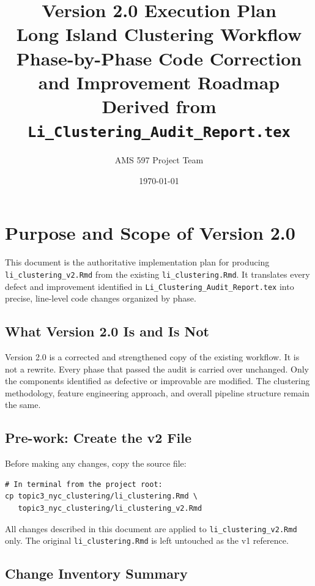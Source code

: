 \documentclass[11pt]{article}
\title{Version 2.0 Execution Plan\\Long Island Clustering Workflow\\
\large Phase-by-Phase Code Correction and Improvement Roadmap\\
Derived from \texttt{Li\_Clustering\_Audit\_Report.tex}}
\author{AMS 597 Project Team}
\date{\today}
\newcommand{\rfile}[1]{\texttt{#1}}
\begin{document}
\maketitle
\tableofcontents
\newpage

\section{Purpose and Scope of Version 2.0}

This document is the authoritative implementation plan for producing
\rfile{li\_clustering\_v2.Rmd} from the existing \rfile{li\_clustering.Rmd}.
It translates every defect and improvement identified in
\rfile{Li\_Clustering\_Audit\_Report.tex} into precise, line-level code changes
organized by phase.

\subsection{What Version 2.0 Is and Is Not}

Version 2.0 is a corrected and strengthened copy of the existing workflow.
It is not a rewrite. Every phase that passed the audit is carried over
unchanged. Only the components identified as defective or improvable are
modified. The clustering methodology, feature engineering approach, and overall
pipeline structure remain the same.

\subsection{Pre-work: Create the v2 File}

Before making any changes, copy the source file:

\begin{lstlisting}
# In terminal from the project root:
cp topic3_nyc_clustering/li_clustering.Rmd \
   topic3_nyc_clustering/li_clustering_v2.Rmd
\end{lstlisting}

All changes described in this document are applied to
\rfile{li\_clustering\_v2.Rmd} only. The original
\rfile{li\_clustering.Rmd} is left untouched as the v1 reference.

\subsection{Change Inventory Summary}
\end{document}
